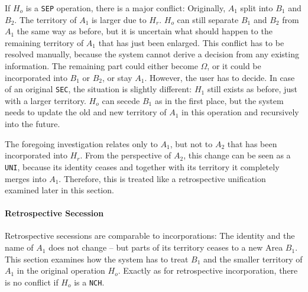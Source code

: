 If $H_o$ is a \texttt{SEP} operation, there is a major conflict: Originally, $A_1$ split into $B_1$ and $B_2$. The territory of $A_1$ is larger due to $H_r$. $H_o$ can still separate $B_1$ and $B_2$ from $A_1$ the same way as before, but it is uncertain what should happen to the remaining territory of $A_1$ that has just been enlarged. This conflict has to be resolved manually, because the system cannot derive a decision from any existing information. The remaining part could either become $\Omega$, or it could be incorporated into $B_1$ or $B_2$, or stay $A_1$. However, the user has to decide. In case of an original \texttt{SEC}, the situation is slightly different: $H_1$ still exists as before, just with a larger territory. $H_o$ can secede $B_1$ as in the first place, but the system needs to update the old and new territory of $A_1$ in this operation and recursively into the future.

The foregoing investigation relates only to $A_1$, but not to $A_2$ that has been incorporated into $H_r$. From the perspective of $A_2$, this change can be seen as a \texttt{UNI}, because its identity ceases and together with its territory it completely merges into $A_1$. Therefore, this is treated like a retrospective unification examined later in this section.


\paragraph{Retrospective Secession} %
\label{par:retrospective_secession}

Retrospective secessions are comparable to incorporations: The identity and the name of $A_1$ does not change -- but parts of its territory ceases to a new Area $B_1$. This section examines how the system has to treat $B_1$ and the smaller territory of $A_1$ in the original operation $H_o$. Exactly as for retrospective incorporation, there is no conflict if $H_o$ is a \texttt{NCH}.

